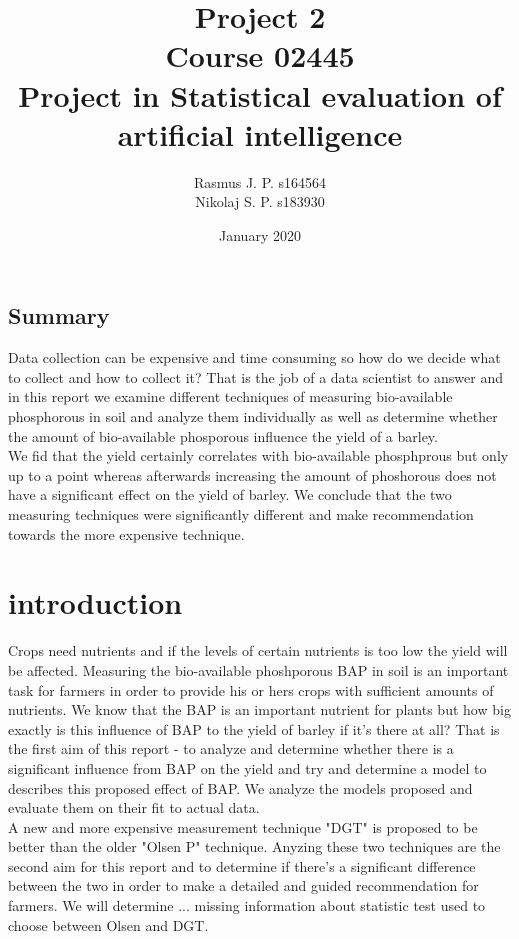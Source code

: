 \documentclass{article}
\begin{document}
\begin{titlepage}
	
	
	\title{Project 2 \\ Course 02445 \\ Project in Statistical evaluation of \\ artificial intelligence }
	\author{Rasmus J. P. s164564 \\ Nikolaj S. P. s183930}
	\date{January 2020}
	\maketitle
	
\subsection*{Summary}
Data collection can be expensive and time consuming so how do we decide what to collect and how to collect it? That is the job of a data scientist to answer and in this report we  examine different techniques of measuring bio-available phosphorous in soil and analyze them individually as well as determine whether the amount of bio-available phosporous influence the yield of a barley. \\ We fid that the yield certainly correlates with bio-available phosphprous but only up to a point whereas afterwards increasing the amount of phoshorous does not have a significant effect on the yield of barley. We conclude that the two measuring techniques were significantly different and make recommendation towards the more expensive technique.
	
\end{titlepage}


\section{introduction}
Crops need nutrients and if the levels of certain nutrients is too low the yield will be affected. Measuring the bio-available phoshporous BAP in soil is an important task for farmers in order to provide his or hers crops with sufficient amounts of nutrients. We know that the BAP is an important nutrient for plants but how big exactly is this influence of BAP to the yield of barley if it's there at all? That is the first aim of this report - to analyze and determine whether there is a significant influence from BAP on the yield and try and determine a model to describes this proposed effect of BAP. We analyze the models proposed and evaluate them on their fit to actual data. \\ A new and more expensive measurement technique "DGT" is proposed to be better than the older "Olsen P" technique. Anyzing these two techniques are the second aim for this report and to determine if there's a significant difference between the two in order to make a detailed and guided recommendation for farmers. We will determine  ... missing information about statistic test used to choose between Olsen and DGT.
\end{document}
